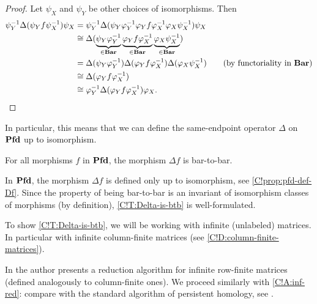 \begin{proof}
  Let $\psi_X$ and $\psi_Y$ be other choices of isomorphisms. Then
  \begin{align*}
    \psi_Y^{-1} \Delta(\psi_Y f \psi_X^{-1}) \psi_X & = \psi_Y^{-1} \Delta (\psi_Y \varphi_Y^{-1} \varphi_Y f \varphi_X^{-1} \varphi_X \psi_X^{-1}) \psi_X \\
    & \cong \Delta(\underbrace{\psi_Y \varphi_Y^{-1}}_{\in \Bar} \underbrace{\varphi_Y f \varphi_X^{-1}}_{\in \Bar} \underbrace{\varphi_X \psi_X^{-1}}_{\in \Bar}) \\
    & = \Delta(\psi_Y \varphi_Y^{-1}) \Delta(\varphi_Y f \varphi_X^{-1}) \Delta(\varphi_X \psi_X^{-1}) \tag{by functoriality in $\Bar$} \\
    & \cong \Delta(\varphi_Y f \varphi_X^{-1}) \\
    & \cong \varphi_Y^{-1} \Delta(\varphi_Y f \varphi_X^{-1}) \varphi_X.
    \qedhere
  \end{align*}
\end{proof}

\begin{remark}
  In particular, this means that we can define the same-endpoint operator $\Delta$ on $\operatorname{\mathbf{Pfd}}$ up to isomorphism.
\end{remark}

\begin{theorem}
\label{C!T:Delta-is-btb}
  For all morphisms $f$ in $\operatorname{\mathbf{Pfd}}$, the morphism $\Delta f$ is bar-to-bar.
\end{theorem}

\begin{remark}
  In $\operatorname{\mathbf{Pfd}}$, the morphism $\Delta f$ is defined only up to isomorphism, see \cref{C!prop:pfd-def-Df}. Since the property of being bar-to-bar is an invariant of isomorphism classes of morphisms (by definition), \cref{C!T:Delta-is-btb} is well-formulated. 
\end{remark}

To show \cref{C!T:Delta-is-btb}, we will be working with infinite (unlabeled) matrices. In particular with infinite column-finite matrices (see \cref{C!D:column-finite-matrices}).

In \cite{Paraskevopoulos2012} the author presents a reduction algorithm for infinite row-finite matrices (defined analogously to column-finite ones). We proceed similarly with \cref{C!A:inf-red}: compare with the standard algorithm of persistent homology, see \cite{CSEM2006}.

